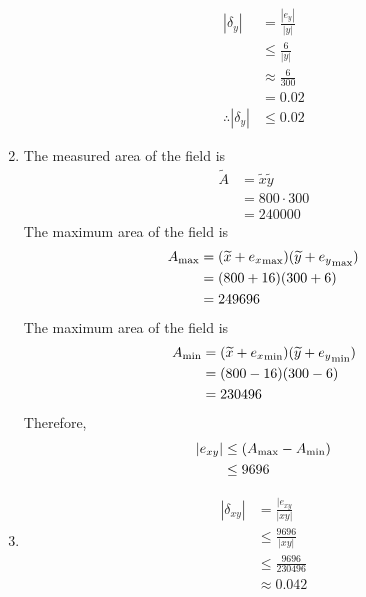\documentclass[fleqn, a4paper, 12pt, twoside]{article}
\theoremstyle{definition}
\theoremstyle{theorem}
\renewcommand{\tilde}{\widetilde}
\begin{document}
\begin{solution}
\begin{enumerate}[leftmargin=*]
			\begin{align*}
				|\delta_y|            & = \frac{|e_y|}{|y|}   \\
                                                      & \le \frac{6}{|y|}     \\
                                                      & \approx \frac{6}{300} \\
                                                      & = 0.02                \\
				\therefore |\delta_y| & \le 0.02
			\end{align*}
		\item
			The measured area of the field is
			\begin{align*}
				\tilde{A} & = \tilde{x} \tilde{y} \\
                                          & = 800 \cdot 300       \\
                                          & = 240000
			\end{align*}
			The maximum area of the field is
			\begin{align*}
				A_{\textnormal{max}} & = (\tilde{x} + {e_x}_{\textnormal{max}}) (\tilde{y} + {e_y}_{\textnormal{max}}) \\
                                                     & = (800 + 16) (300 + 6)                                                          \\
                                                     & = 249696
			\end{align*}
			The maximum area of the field is
			\begin{align*}
				A_{\textnormal{min}} & = (\tilde{x} + {e_x}_{\textnormal{min}}) (\tilde{y} + {e_y}_{\textnormal{min}}) \\
                                                     & = (800 - 16) (300 - 6)                                                          \\
                                                     & = 230496
			\end{align*}
			Therefore,
			\begin{align*}
				|e_{x y}| & \le (A_{\textnormal{max}} - A_{\textnormal{min}}) \\
                                          & \le 9696
			\end{align*}
		\item
			\begin{align*}
				|\delta_{x y}| & = \frac{|e_{x y}}{|x y|} \\
                                               & \le \frac{9696}{|x y|}   \\
                                               & \le \frac{9696}{230496}  \\
                                               & \approx 0.042
			\end{align*}
	\end{enumerate}
\end{solution}
\end{document}
